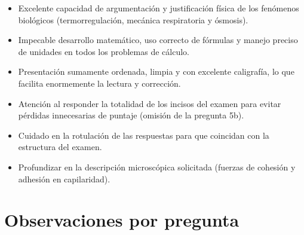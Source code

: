 \documentclass[11pt,a4paper]{article}
\begin{document}
\vspace{4pt}
\begin{minipage}[t]{0.48\linewidth}
  \begin{tcolorbox}[cajaFortaleza, title={Fortalezas}]
\begin{itemize}[leftmargin=1.5em, itemsep=2pt]
  \item Excelente capacidad de argumentación y justificación física de los fenómenos biológicos (termorregulación, mecánica respiratoria y ósmosis).
  \item Impecable desarrollo matemático, uso correcto de fórmulas y manejo preciso de unidades en todos los problemas de cálculo.
  \item Presentación sumamente ordenada, limpia y con excelente caligrafía, lo que facilita enormemente la lectura y corrección.
\end{itemize}
  \end{tcolorbox}
\end{minipage}
\hfill
\begin{minipage}[t]{0.48\linewidth}
  \begin{tcolorbox}[cajaMejora, title={Areas de mejora}]
\begin{itemize}[leftmargin=1.5em, itemsep=2pt]
  \item Atención al responder la totalidad de los incisos del examen para evitar pérdidas innecesarias de puntaje (omisión de la pregunta 5b).
  \item Cuidado en la rotulación de las respuestas para que coincidan con la estructura del examen.
  \item Profundizar en la descripción microscópica solicitada (fuerzas de cohesión y adhesión en capilaridad).
\end{itemize}
  \end{tcolorbox}
\end{minipage}

\section*{Observaciones por pregunta}
\end{document}

